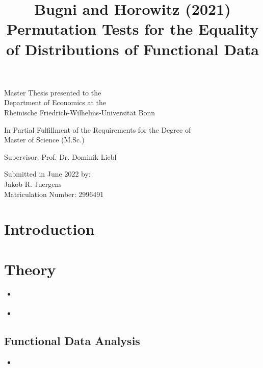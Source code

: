 \documentclass[11pt,twoside,a4paper]{article}
\begin{document}
	
	\title{{\huge Bugni and Horowitz (2021) Permutation Tests for the Equality of Distributions of Functional Data}}
	\date{}
	\maketitle
	\thispagestyle{empty}
	\vspace{1.5 cm}
	\begin{center}
		
		\Large
		Master Thesis presented to the\\
		Department of Economics at the\\
		Rheinische Friedrich-Wilhelms-Universität Bonn
		\vspace{1.5cm}

		\large
		In Partial Fulfillment of the Requirements for the Degree of\\
		Master of Science (M.Sc.)
		
		\vspace{3cm}
		
		Supervisor: Prof. Dr. Dominik Liebl
		
		\vspace{3cm}
		
		Submitted in June 2022 by: \\
		Jakob R. Juergens\\
		Matriculation Number: 2996491
	\end{center}
	
	\newpage
	
	\thispagestyle{empty}
	\tableofcontents
	
	\newpage
	
	\section{Introduction}
	
	\section{Theory}
		\begin{itemize}
			\item \cite{bugni_permutation_2021}
			\item \cite{bugni_goodness--fit_2009}
		\end{itemize}
	
		\subsection{Functional Data Analysis}
			\begin{itemize}
				\item \cite{ramsay_functional_2005}
			\end{itemize}
		
\end{document}
